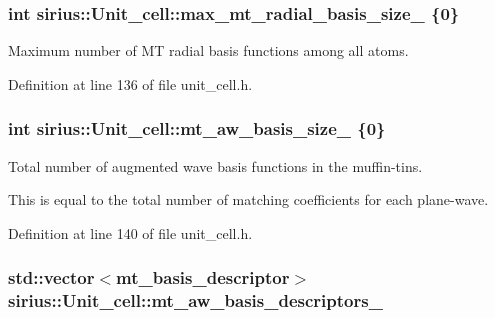 \subsubsection[{max\+\_\+mt\+\_\+radial\+\_\+basis\+\_\+size\+\_\+}]{\setlength{\rightskip}{0pt plus 5cm}int sirius\+::\+Unit\+\_\+cell\+::max\+\_\+mt\+\_\+radial\+\_\+basis\+\_\+size\+\_\+ \{0\}\hspace{0.3cm}{\ttfamily [private]}}\label{classsirius_1_1_unit__cell_aeb3c8a1990a2121ffc9feabf9793d1f0}


Maximum number of M\+T radial basis functions among all atoms. 



Definition at line 136 of file unit\+\_\+cell.\+h.

\hypertarget{classsirius_1_1_unit__cell_a5b4e200542b2d648832108478296d9f3}{}
\subsubsection[{mt\+\_\+aw\+\_\+basis\+\_\+size\+\_\+}]{\setlength{\rightskip}{0pt plus 5cm}int sirius\+::\+Unit\+\_\+cell\+::mt\+\_\+aw\+\_\+basis\+\_\+size\+\_\+ \{0\}\hspace{0.3cm}{\ttfamily [private]}}\label{classsirius_1_1_unit__cell_a5b4e200542b2d648832108478296d9f3}


Total number of augmented wave basis functions in the muffin-\/tins. 

This is equal to the total number of matching coefficients for each plane-\/wave. 

Definition at line 140 of file unit\+\_\+cell.\+h.

\hypertarget{classsirius_1_1_unit__cell_af2ca4393c20299bf86b38d7a23c1fcab}{}
\subsubsection[{mt\+\_\+aw\+\_\+basis\+\_\+descriptors\+\_\+}]{\setlength{\rightskip}{0pt plus 5cm}std\+::vector$<${\bf mt\+\_\+basis\+\_\+descriptor}$>$ sirius\+::\+Unit\+\_\+cell\+::mt\+\_\+aw\+\_\+basis\+\_\+descriptors\+\_\+\hspace{0.3cm}{\ttfamily [private]}}\label{classsirius_1_1_unit__cell_af2ca4393c20299bf86b38d7a23c1fcab}


